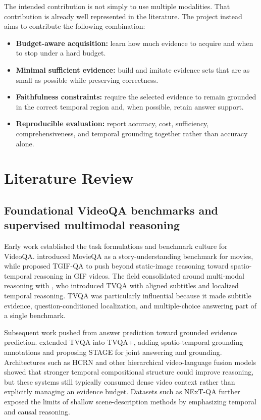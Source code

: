 \documentclass{article}
\begin{document}
The intended contribution is not simply to use multiple modalities.
That contribution is already well represented in the literature.
The project instead aims to contribute the following combination:
\begin{itemize}
  \item \textbf{Budget-aware acquisition:} learn how much evidence to acquire and when to stop under a hard budget.
  \item \textbf{Minimal sufficient evidence:} build and imitate evidence sets that are as small as possible while preserving correctness.
  \item \textbf{Faithfulness constraints:} require the selected evidence to remain grounded in the correct temporal region and, when possible, retain answer support.
  \item \textbf{Reproducible evaluation:} report accuracy, cost, sufficiency, comprehensiveness, and temporal grounding together rather than accuracy alone.
\end{itemize}

\section{Literature Review}
\subsection{Foundational VideoQA benchmarks and supervised multimodal reasoning}
Early work established the task formulations and benchmark culture for VideoQA.
\citet{tapaswi2016movieqa} introduced MovieQA as a story-understanding benchmark for movies, while \citet{jang2017tgifqa} proposed TGIF-QA to push beyond static-image reasoning toward spatio-temporal reasoning in GIF videos.
The field consolidated around multi-modal reasoning with \citet{lei2018tvqa}, who introduced TVQA with aligned subtitles and localized temporal reasoning.
TVQA was particularly influential because it made subtitle evidence, question-conditioned localization, and multiple-choice answering part of a single benchmark.

Subsequent work pushed from answer prediction toward grounded evidence prediction.
\citet{lei2019tvqaplus} extended TVQA into TVQA+, adding spatio-temporal grounding annotations and proposing STAGE for joint answering and grounding.
Architectures such as HCRN \citep{le2020hcrn} and other hierarchical video-language fusion models showed that stronger temporal compositional structure could improve reasoning, but these systems still typically consumed dense video context rather than explicitly managing an evidence budget.
Datasets such as NExT-QA \citep{xiao2021nextqa} further exposed the limits of shallow scene-description methods by emphasizing temporal and causal reasoning.
\end{document}
